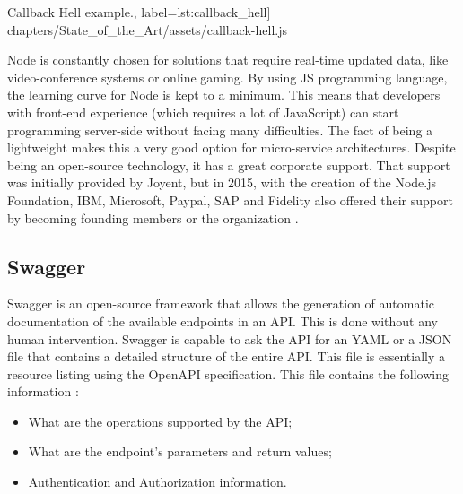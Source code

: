 \begin{minipage}{\linewidth}
{Callback Hell example\protect\footnotemark.},
label=lst:callback_hell]
{chapters/State_of_the_Art/assets/callback-hell.js}
\end{minipage}

\par
 Node is constantly chosen for solutions that require real-time updated data, like video-conference systems or online gaming. By using \gls{JS} programming language, the learning curve for Node is kept to a minimum. This means that developers with front-end experience (which requires a lot of JavaScript) can start programming server-side without facing many difficulties. The fact of being a lightweight makes this a very good option for micro-service architectures. Despite being an open-source technology, it has a great corporate support. That support was initially provided by Joyent, but in 2015, with the creation of the Node.js Foundation, IBM, Microsoft, Paypal, SAP and Fidelity also offered their support by becoming founding members or the organization \parencite{goodAndBadOfNode}.
\par


\subsection{Swagger}
\label{sub:swagger}
Swagger is an open-source framework that allows the generation of automatic documentation of the available endpoints in an \gls{API}. This is done without any human intervention. Swagger is capable to ask the \gls{API} for an YAML or a JSON file that contains a detailed structure of the entire \gls{API}. This file is essentially a resource listing using the OpenAPI specification. This file contains the following information \parencite{whatIsSwagger}:
\begin{itemize}
    \item What are the operations supported by the \gls{API};
    \item What are the endpoint's parameters and return values;
    \item Authentication and Authorization information.
\end{itemize}

